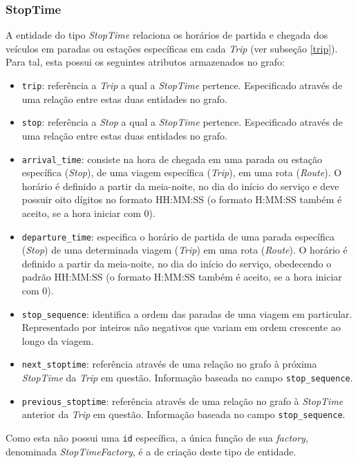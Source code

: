 \subsubsection{StopTime}
\label{stoptime}
A entidade do tipo \emph{StopTime} relaciona os horários de partida e chegada dos veículos em paradas ou estações específicas em cada \emph{Trip} (ver subseção \ref{trip}).
Para tal, esta possui os seguintes atributos armazenados no grafo:
\begin{itemize}
	\item \texttt{trip}: referência a \emph{Trip} a qual a \emph{StopTime} pertence.
	Especificado através de uma relação entre estas duas entidades no grafo.
	\item \texttt{stop}: referência a \emph{Stop} a qual a \emph{StopTime} pertence.
	Especificado através de uma relação entre estas duas entidades no grafo.
	\item \texttt{arrival\_time}: consiste na hora de chegada em uma parada ou estação específica (\emph{Stop}), de uma viagem específica (\emph{Trip}), em uma rota 	(\emph{Route}). 
	O horário é definido a partir da meia-noite, no dia do início do serviço e deve possuir oito dígitos no formato HH:MM:SS (o formato H:MM:SS também é aceito, se       
	a hora iniciar com 0).
	\item \texttt{departure\_time}: especifica o horário de partida de uma parada específica (\emph{Stop}) de uma determinada viagem (\emph{Trip}) em uma rota 				(\emph{Route}).
	O horário é definido a partir da meia-noite, no dia do início do serviço, obedecendo o padrão HH:MM:SS (o formato H:MM:SS também é aceito, se a hora iniciar com 	0).
	\item \texttt{stop\_sequence}: identifica a ordem das paradas de uma viagem em particular. 
	Representado por inteiros não negativos que variam em ordem crescente ao longo da viagem.
	\item \texttt{next\_stoptime}: referência através de uma relação no grafo à próxima \emph{StopTime} da \emph{Trip} em questão.
	Informação baseada no campo \texttt{stop\_sequence}.
	\item \texttt{previous\_stoptime}: referência através de uma relação no grafo à \emph{StopTime} anterior da \emph{Trip} em questão.
	Informação baseada no campo \texttt{stop\_sequence}.
\end{itemize}

Como esta não possui uma \texttt{id} específica, a única função de sua \emph{factory}, denominada \emph{StopTimeFactory}, é a de criação deste tipo de entidade.

